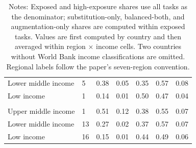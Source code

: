 \begin{table}[H]
\begin{tabular}{@{}L{0.23\textwidth}C{0.08\textwidth}C{0.11\textwidth}C{0.11\textwidth}C{0.10\textwidth}C{0.09\textwidth}C{0.10\textwidth}@{}}
Lower middle income & 5 & 0.38 & 0.05 & 0.35 & 0.57 & 0.08 \\
Low income & 1 & 0.14 & 0.01 & 0.50 & 0.47 & 0.04 \\
\addlinespace[0.35em]
 \\
Upper middle income & 1 & 0.51 & 0.12 & 0.38 & 0.55 & 0.07 \\
Lower middle income & 13 & 0.27 & 0.02 & 0.37 & 0.57 & 0.07 \\
Low income & 16 & 0.15 & 0.01 & 0.44 & 0.49 & 0.06 \\
\bottomrule
\end{tabular}
\caption*{\footnotesize Notes: Exposed and high-exposure shares use all tasks as the denominator; substitution-only, balanced-both, and augmentation-only shares are computed within exposed tasks. Values are first computed by country and then averaged within region $\times$ income cells. Two countries without World Bank income classifications are omitted. Regional labels follow the paper's seven-region convention.}
\end{table}
